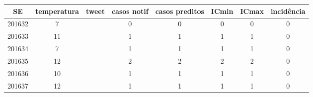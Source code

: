 \begin{tabular}{c|ccccccc}
  \hline
SE & temperatura & tweet & casos notif & casos preditos & ICmin & ICmax & incidência \\ 
  \hline
201632 & 7 &  & 0 & 0 & 0 & 0 & 0 \\ 
  201633 & 11 &  & 1 & 1 & 1 & 1 & 0 \\ 
  201634 & 7 &  & 1 & 1 & 1 & 1 & 0 \\ 
  201635 & 12 &  & 2 & 2 & 2 & 2 & 0 \\ 
  201636 & 10 &  & 1 & 1 & 1 & 1 & 0 \\ 
  201637 & 12 &  & 1 & 1 & 1 & 1 & 0 \\ 
   \hline
\end{tabular}
